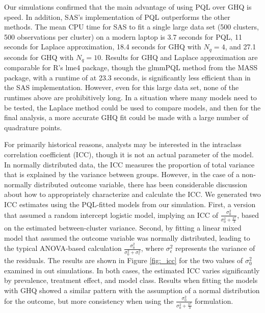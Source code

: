 \documentclass{article}
\begin{document}
\begin{flushleft}
Our simulations confirmed that the main advantage of using PQL over GHQ is speed.  In addition, SAS's implementation of PQL outperforms the other methods. The mean CPU time for SAS to fit a single large data set (500 clusters, 500 observations per cluster) on a modern laptop is 3.7 seconds for PQL, 11 seconds for Laplace approximation, 18.4 seconds for GHQ with $N_q=4$, and 27.1 seconds for GHQ with $N_q=10$. Results for GHQ and Laplace approximation are comparable for R's lme4 package, though the glmmPQL method from the MASS package, with a runtime of at 23.3 seconds, is significantly less efficient than in the SAS implementation. However, even for this large data set, none of the runtimes above are prohibitively long. In a situation where many models need to be tested, the Laplace method could be used to compare models, and then for the final analysis, a more accurate GHQ fit could be made with a large number of quadrature points.


For primarily historical reasons, analysts may be interested in the intraclass correlation coefficient (ICC), though it is not an actual parameter of the model. In normally distributed data, the ICC measures the proportion of total variance that is explained by the variance between groups. However, in the case of a non-normally distributed outcome variable, there has been considerable discussion about how to appropriately characterize and calculate the ICC\cite{wu_comparison_2012}\cite{nakagawa_shinichi_coefficient_2017}. We generated two ICC estimates using the PQL-fitted models from our simulation.  First, a version that assumed a random intercept logistic model, implying an ICC of $\frac{\sigma^2_0}{\sigma^2_0+\frac{\pi^2}{3}}$, based on the estimated between-cluster variance. Second, by fitting a linear mixed model that assumed the outcome variable was normally distributed, leading to the typical ANOVA-based calculation $\frac{\sigma^2_0}{\sigma^2_0+\sigma^2_{\epsilon}}$, where $\sigma^2_{\epsilon}$ represents the variance of the residuals. The results are shown in Figure \ref{fig:_icc} for the two values of $\sigma^2_0$ examined in out simulations. In both cases, the estimated ICC varies significantly by prevalence, treatment effect, and model class. Results when fitting the models with GHQ showed a similar pattern with the assumption of a normal distribution for the outcome, but more consistency when using the $\frac{\sigma^2_0}{\sigma^2_0+\frac{\pi^2}{3}}$ formulation. 


\end{flushleft}
\end{document}
